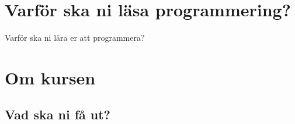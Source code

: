 %
%


\section{Varför ska ni läsa programmering?}

\begin{frame}
  \begin{center}
    Varför ska ni lära er att programmera?
  \end{center}
\end{frame}


\section{Om kursen}

\subsection{Vad ska ni få ut?}

